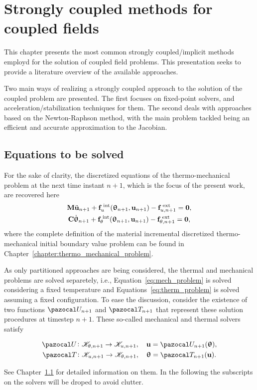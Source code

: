 \chapter{Strongly coupled methods for coupled fields}

This chapter presents the most common strongly coupled/implicit methods employd for the solution of coupled field problems.
This presentation seeks to provide a literature overview of the available approaches.

Two main ways of realizing a strongly coupled approach to the solution of the coupled problem are presented.
The first focuses on fixed-point solvers, and acceleration/stabilization techniques for them.
The second deals with approaches based on the Newton-Raphson method, with the main problem tackled being an efficient and accurate approximation to the Jacobian.

\section{Equations to be solved}

For the sake of clarity, the discretized equations of the thermo-mechanical problem at the next time instant \(n+1\), which is the focus of the present work, are recovered here
\begin{gather}
    \mathbf M \ddot{\mathbf u}_{n+1} +\mathbf f_u^\text{\;int}(\bm \uptheta_{n+1}, \mathbf u_{n+1})-\mathbf f^\text{\;ext}_{u,n+1}=\mathbf 0, \label{eq:mech_problem} \\
    \mathbf C \dot{\bm \uptheta}_{n+1} +\mathbf f_\theta^\text{\;int}(\bm \uptheta_{n+1}, \mathbf u_{n+1})-\mathbf f^\text{\;ext}_{\theta,n+1}=\mathbf 0, \label{eq:therm_problem}
\end{gather}
where the complete definition of the material incremental discretized thermo-mechanical initial boundary value problem can be found in Chapter~\ref{chapter:thermo_mechanical_problem}.

As only partitioned approaches are being considered, the thermal and mechanical problems are solved separetely, i.e., Equation~\eqref{eq:mech_problem} is solved considering a fixed temperature and Equations~\eqref{eq:therm_problem} is solved assuming a fixed configuration.
To ease the discussion, consider the existence of two functions \(\pazocal U_{n+1}\) and \(\pazocal T_{n+1}\) that represent these solution procedures at timestep \(n+1\).
These so-called mechanical and thermal solvers satisfy
\begin{highlight}[innertopmargin=-5pt]
\begin{gather}
  \pazocal U\colon \mathscr K_{\theta, n+1}\to \mathscr K_{u,n+1},\quad \mathbf u = \pazocal U_{n+1}(\bm \uptheta),\\
  \pazocal T\colon \mathscr K_{u,n+1}\to \mathscr K_{\theta, n+1},\quad \bm \uptheta = \pazocal T_{n+1}(\mathbf u).
\end{gather}
\end{highlight}
See Chapter~\ref{} for detailed information on them.
In the following the subscripts on the solvers will be droped to avoid clutter.

